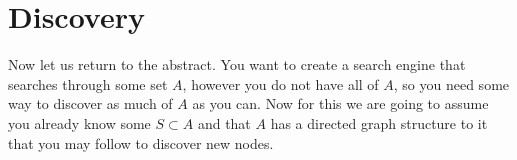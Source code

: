 \documentclass{article}
\begin{document}
	
	
	\section{Discovery}
	Now let us return to the abstract. You want to create a search engine that searches through some set $A$, however you do not have all of $A$, so you need some way to discover as much of $A$ as you can. Now for this we are going to assume you already know some $S\subset A$ and that $A$ has a directed graph structure to it that you may follow to discover new nodes. 
	
\end{document}
